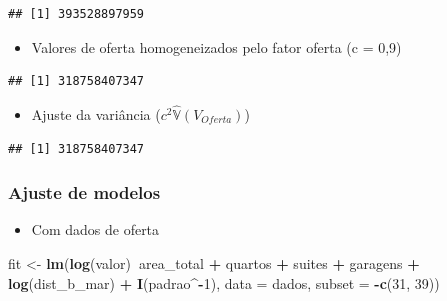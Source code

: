 \documentclass{article}
\newenvironment{Shaded}{\begin{snugshade}}{\end{snugshade}}
\newcommand{\DataTypeTok}[1]{\textcolor[rgb]{0.13,0.29,0.53}{#1}}
\newcommand{\DecValTok}[1]{\textcolor[rgb]{0.00,0.00,0.81}{#1}}
\newcommand{\FloatTok}[1]{\textcolor[rgb]{0.00,0.00,0.81}{#1}}
\newcommand{\KeywordTok}[1]{\textcolor[rgb]{0.13,0.29,0.53}{\textbf{#1}}}
\newcommand{\NormalTok}[1]{#1}
\newcommand{\OperatorTok}[1]{\textcolor[rgb]{0.81,0.36,0.00}{\textbf{#1}}}
\newcommand{\OtherTok}[1]{\textcolor[rgb]{0.56,0.35,0.01}{#1}}
\newcommand{\StringTok}[1]{\textcolor[rgb]{0.31,0.60,0.02}{#1}}
\begin{document}
\begin{verbatim}
## [1] 393528897959
\end{verbatim}

\begin{itemize}
\tightlist
\item
  Valores de oferta homogeneizados pelo fator oferta (c = 0,9)
\end{itemize}

\begin{Shaded}
\end{Shaded}

\begin{verbatim}
## [1] 318758407347
\end{verbatim}

\begin{itemize}
\tightlist
\item
  Ajuste da variância (\(c^2 \hat{\mathbb{V}}(V_{Oferta})\))
\end{itemize}

\begin{Shaded}
\end{Shaded}

\begin{verbatim}
## [1] 318758407347
\end{verbatim}

\hypertarget{ajuste-de-modelos}{%
\subsubsection{Ajuste de modelos}\label{ajuste-de-modelos}}

\begin{itemize}
\tightlist
\item
  Com dados de oferta
\end{itemize}

\begin{Shaded}
\begin{Highlighting}[]
\NormalTok{fit <-}\StringTok{ }\KeywordTok{lm}\NormalTok{(}\KeywordTok{log}\NormalTok{(valor)}\OperatorTok{~}\NormalTok{area_total }\OperatorTok{+}\StringTok{ }\NormalTok{quartos }\OperatorTok{+}\StringTok{ }\NormalTok{suites }\OperatorTok{+}\StringTok{ }\NormalTok{garagens }\OperatorTok{+}\StringTok{ }
\StringTok{            }\KeywordTok{log}\NormalTok{(dist_b_mar) }\OperatorTok{+}\StringTok{ }\KeywordTok{I}\NormalTok{(padrao}\OperatorTok{^-}\DecValTok{1}\NormalTok{), }\DataTypeTok{data =}\NormalTok{ dados, }\DataTypeTok{subset =} \OperatorTok{-}\KeywordTok{c}\NormalTok{(}\DecValTok{31}\NormalTok{, }\DecValTok{39}\NormalTok{))}
\end{Highlighting}
\end{Shaded}
\end{document}
